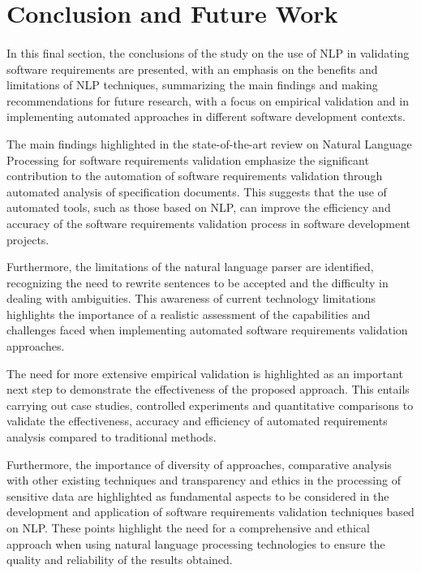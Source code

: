 \section{Conclusion and Future Work}
\sloppy
\paragraph{}
In this final section, the conclusions of the study on the use of NLP in validating software requirements are presented, with an emphasis on the benefits and limitations of NLP techniques, summarizing the main findings and making recommendations for future research, with a focus on empirical validation and in implementing automated approaches in different software development contexts.

The main findings highlighted in the state-of-the-art review on Natural Language Processing for software requirements validation emphasize the significant contribution to the automation of software requirements validation through automated analysis of specification documents. This suggests that the use of automated tools, such as those based on NLP, can improve the efficiency and accuracy of the software requirements validation process in software development projects.

Furthermore, the limitations of the natural language parser are identified, recognizing the need to rewrite sentences to be accepted and the difficulty in dealing with ambiguities. This awareness of current technology limitations highlights the importance of a realistic assessment of the capabilities and challenges faced when implementing automated software requirements validation approaches.

The need for more extensive empirical validation is highlighted as an important next step to demonstrate the effectiveness of the proposed approach. This entails carrying out case studies, controlled experiments and quantitative comparisons to validate the effectiveness, accuracy and efficiency of automated requirements analysis compared to traditional methods.

Furthermore, the importance of diversity of approaches, comparative analysis with other existing techniques and transparency and ethics in the processing of sensitive data are highlighted as fundamental aspects to be considered in the development and application of software requirements validation techniques based on NLP. These points highlight the need for a comprehensive and ethical approach when using natural language processing technologies to ensure the quality and reliability of the results obtained.

